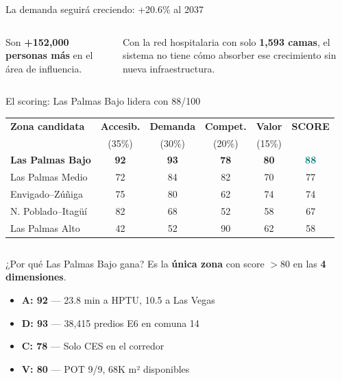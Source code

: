 \documentclass[aspectratio=169, 11pt]{beamer}
\newcommand{\highlight}[1]{\textcolor{teal}{\textbf{#1}}}
\begin{document}
\begin{frame}{La demanda seguirá creciendo: +20.6\% al 2037}
\begin{columns}[T]
\vspace{10pt}
Son \textbf{+152,000 personas más} en el área de influencia.

\vspace{6pt}
Con la red hospitalaria con solo \textbf{1,593 camas}, el sistema no tiene cómo absorber ese crecimiento sin nueva infraestructura.
\end{columns}
\end{frame}

\begin{frame}{El scoring: Las Palmas Bajo lidera con 88/100}

\begin{center}
{\small
\begin{tabular}{@{}l*{4}{c}c@{}}
\toprule
\textbf{Zona candidata} & \textbf{Accesib.} & \textbf{Demanda} & \textbf{Compet.} & \textbf{Valor} & \textbf{SCORE} \\
 & {\tiny(35\%)} & {\tiny(30\%)} & {\tiny(20\%)} & {\tiny(15\%)} & \\
\midrule
\rowcolor{teal!12}
\textbf{Las Palmas Bajo} & \textbf{92} & \textbf{93} & \textbf{78} & \textbf{80} & \highlight{88} \\
Las Palmas Medio & 72 & 84 & 82 & 70 & 77 \\
Envigado--Zúñiga & 75 & 80 & 62 & 74 & 74 \\
N. Poblado--Itagüí & 82 & 68 & 52 & 58 & 67 \\
\rowcolor{coral!6}
Las Palmas Alto & 42 & 52 & 90 & 62 & 58 \\
\bottomrule
\end{tabular}
}
\end{center}

\vspace{6pt}
\begin{columns}[T]
\begin{exampleblock}{\small ¿Por qué Las Palmas Bajo gana?}
\small
Es la \textbf{única zona} con score $>$80 en las \textbf{4 dimensiones}.

\vspace{4pt}
\begin{itemize}\small
  \item \textbf{A: 92} — 23.8 min a HPTU, 10.5 a Las Vegas
  \item \textbf{D: 93} — 38,415 predios E6 en comuna 14
  \item \textbf{C: 78} — Solo CES en el corredor
  \item \textbf{V: 80} — POT 9/9, 68K m² disponibles
\end{itemize}
\end{exampleblock}


\end{columns}
\end{frame}
\end{document}
